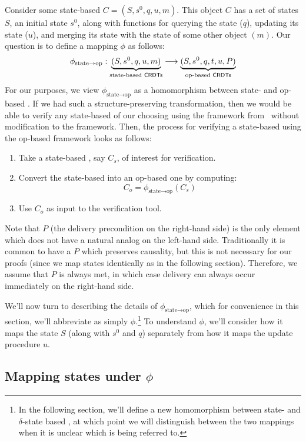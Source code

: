 Consider some state-based \CRDT $C = (S, s^0, q, u, m)$. This object $C$ has a
set of states $S$, an initial state $s^0$, along with functions for querying the
state ($q$), updating its state ($u$), and merging its state with the state of
some other object $(m)$. Our question is to define a mapping $\phi$ as
follows:
\[
  \phi_{\text{state} \to \text{op}} :
    \underbrace{(S, s^0, q, u, m)}_{\text{state-based \textsf{CRDTs}}} \longrightarrow
    \underbrace{(S, s^0, q, t, u, P)}_{\text{op-based \textsf{CRDTs}}}
\]
For our purposes, we view $\phi_{\text{state} \to \text{op}}$ as a homomorphism
between state- and op-based \CRDTs. If we had such a structure-preserving
transformation, then we would be able to verify any state-based \CRDT of our
choosing using the framework from~\citet{gomes17} without modification to the
framework. Then, the process for verifying a state-based \CRDT using the
op-based framework looks as follows:
\begin{enumerate}
  \item Take a state-based \CRDT, say $C_s$, of interest for verification.
  \item Convert the state-based \CRDT into an op-based one by computing:
    \[
      C_o = \phi_{\text{state} \to \text{op}}(C_s)
    \]
  \item Use $C_o$ as input to the verification tool.
\end{enumerate}

Note that $P$ (the delivery precondition on the right-hand side) is the only
element which does not have a natural analog on the left-hand side.
Traditionally it is common to have a $P$ which preserves causality, but this is
not necessary for our proofs (since we map states identically as in the
following section). Therefore, we assume that $P$ is always met, in which case
delivery can always occur immediately on the right-hand side.

We'll now turn to describing the details of $\phi_{\text{state} \to \text{op}}$,
which for convenience in this section, we'll abbreviate as simply
$\phi$.\footnote{In the following section, we'll define a new homomorphism
between state- and $\delta$-state based \CRDTs, at which point we will
distinguish between the two mappings when it is unclear which is being referred
to.} To understand $\phi$, we'll consider how it maps the state $S$ (along with
$s^0$ and $q$) separately from how it maps the update procedure $u$.

\subsection{Mapping states under $\phi$}


